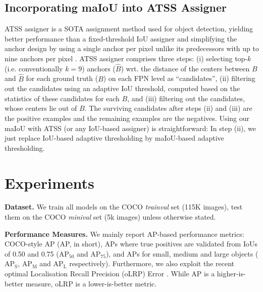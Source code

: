 \documentclass{bmvc2k}
\begin{document}
\subsection{Incorporating maIoU into ATSS Assigner}
\label{subsec:ATSS}
ATSS assigner \cite{ATSS} is a SOTA assignment method used for object detection, yielding better performance than a fixed-threshold IoU assigner and simplifying the anchor design by using a single anchor per pixel unlike its predecessors with up to nine anchors per pixel \cite{FocalLoss}. ATSS assigner comprises three steps: (i) selecting top-$k$ (i.e. conventionally $k=9$) anchors ($\hat{B}$) wrt. the distance of the centers between $B$ and $\hat{B}$ for each ground truth ($B$) on each FPN level as ``candidates'', (ii) filtering out the candidates using an adaptive IoU threshold, computed based on the statistics of these candidates for each $B$, and (iii) filtering out the candidates, whose centers lie out of $B$. The surviving candidates after steps (ii) and (iii) are the positive examples and the remaining examples are the negatives. Using our maIoU with ATSS (or any IoU-based assigner) is straightforward: In step (ii), we just replace IoU-based adaptive thresholding by maIoU-based adaptive thresholding.
 \section{Experiments}
\label{sec:Experiments}

\noindent \textbf{Dataset.} We train all models on the COCO \textit{trainval} set \cite{COCO} (115K images), test them on the COCO \textit{minival} set (5k images) unless otherwise stated.

\noindent \textbf{Performance Measures.} We mainly report AP-based performance metrics: COCO-style AP (AP, in short), APs where true positives are validated from IoUs of 0.50 and 0.75 ($\mathrm{AP_{50}}$ and $\mathrm{AP_{75}}$), and APs for small, medium and large objects ($\mathrm{AP_{S}}$, $\mathrm{AP_{M}}$ and $\mathrm{AP_{L}}$ respectively). Furthermore, we also exploit the recent optimal Localisation Recall Precision (oLRP) Error \cite{LRP, LRParXiv}. While  AP is a  higher-is-better measure, oLRP is a lower-is-better metric.
\end{document}
